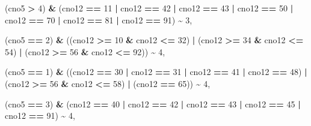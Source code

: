 \documentclass[
]{article}
\newenvironment{Shaded}{\begin{snugshade}}{\end{snugshade}}
\newcommand{\DecValTok}[1]{\textcolor[rgb]{0.00,0.00,0.81}{#1}}
\newcommand{\NormalTok}[1]{#1}
\newcommand{\SpecialCharTok}[1]{\textcolor[rgb]{0.81,0.36,0.00}{\textbf{#1}}}
\begin{document}
\begin{Shaded}
\begin{Highlighting}[]
\NormalTok{                        (cno5 }\SpecialCharTok{\textgreater{}} \DecValTok{4}\NormalTok{) }\SpecialCharTok{\&}\NormalTok{ (cno12 }\SpecialCharTok{==} \DecValTok{11} \SpecialCharTok{|}\NormalTok{ cno12 }\SpecialCharTok{==} \DecValTok{42} \SpecialCharTok{|}\NormalTok{ cno12 }\SpecialCharTok{==} \DecValTok{43} \SpecialCharTok{|} 
\NormalTok{                        cno12 }\SpecialCharTok{==} \DecValTok{50} \SpecialCharTok{|}\NormalTok{ cno12 }\SpecialCharTok{==} \DecValTok{70} \SpecialCharTok{|}\NormalTok{ cno12 }\SpecialCharTok{==} \DecValTok{81} \SpecialCharTok{|}\NormalTok{ cno12 }\SpecialCharTok{==} \DecValTok{91}\NormalTok{) }\SpecialCharTok{\textasciitilde{}} \DecValTok{3}\NormalTok{,}
                        
\NormalTok{                        (cno5 }\SpecialCharTok{==} \DecValTok{2}\NormalTok{) }\SpecialCharTok{\&}\NormalTok{ ((cno12 }\SpecialCharTok{\textgreater{}=} \DecValTok{10} \SpecialCharTok{\&}\NormalTok{ cno12 }\SpecialCharTok{\textless{}=} \DecValTok{32}\NormalTok{) }\SpecialCharTok{|}\NormalTok{ (cno12 }\SpecialCharTok{\textgreater{}=} \DecValTok{34} \SpecialCharTok{\&}\NormalTok{ cno12 }\SpecialCharTok{\textless{}=} \DecValTok{54}\NormalTok{) }\SpecialCharTok{|} 
\NormalTok{                        (cno12 }\SpecialCharTok{\textgreater{}=} \DecValTok{56} \SpecialCharTok{\&}\NormalTok{ cno12 }\SpecialCharTok{\textless{}=} \DecValTok{92}\NormalTok{)) }\SpecialCharTok{\textasciitilde{}} \DecValTok{4}\NormalTok{,}
                        
\NormalTok{                        (cno5 }\SpecialCharTok{==} \DecValTok{1}\NormalTok{) }\SpecialCharTok{\&}\NormalTok{ ((cno12 }\SpecialCharTok{==} \DecValTok{30} \SpecialCharTok{|}\NormalTok{ cno12 }\SpecialCharTok{==} \DecValTok{31} \SpecialCharTok{|}\NormalTok{ cno12 }\SpecialCharTok{==} \DecValTok{41} \SpecialCharTok{|}\NormalTok{ cno12 }\SpecialCharTok{==} \DecValTok{48}\NormalTok{) }\SpecialCharTok{|} 
\NormalTok{                        (cno12 }\SpecialCharTok{\textgreater{}=} \DecValTok{56} \SpecialCharTok{\&}\NormalTok{ cno12 }\SpecialCharTok{\textless{}=} \DecValTok{58}\NormalTok{) }\SpecialCharTok{|}\NormalTok{ (cno12 }\SpecialCharTok{==} \DecValTok{65}\NormalTok{)) }\SpecialCharTok{\textasciitilde{}} \DecValTok{4}\NormalTok{,}
                        
\NormalTok{                        (cno5 }\SpecialCharTok{==} \DecValTok{3}\NormalTok{) }\SpecialCharTok{\&}\NormalTok{ (cno12 }\SpecialCharTok{==} \DecValTok{40} \SpecialCharTok{|}\NormalTok{ cno12 }\SpecialCharTok{==} \DecValTok{42} \SpecialCharTok{|}\NormalTok{ cno12 }\SpecialCharTok{==} \DecValTok{43} \SpecialCharTok{|}\NormalTok{ cno12 }\SpecialCharTok{==} \DecValTok{45} \SpecialCharTok{|} 
\NormalTok{                        cno12 }\SpecialCharTok{==} \DecValTok{91}\NormalTok{) }\SpecialCharTok{\textasciitilde{}} \DecValTok{4}\NormalTok{,}
                        

\end{Highlighting}
\end{Shaded}
\end{document}
